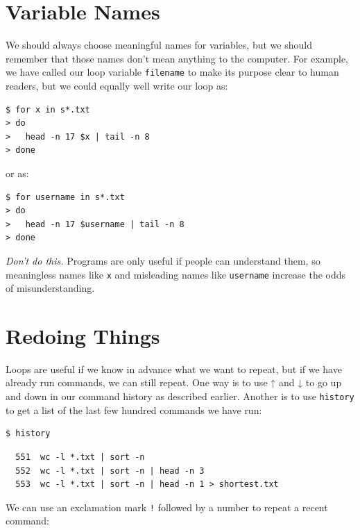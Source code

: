 \documentclass[
]{krantz}
\begin{document}
\hypertarget{bash-tools-meaningless}{%
\section{Variable Names}\label{bash-tools-meaningless}}

We should always choose meaningful names for variables,
but we should remember that those names don't mean anything to the computer.
For example,
we have called our loop variable \texttt{filename}
to make its purpose clear to human readers,
but we could equally well write our loop as:

\begin{verbatim}
$ for x in s*.txt
> do
>   head -n 17 $x | tail -n 8
> done
\end{verbatim}

or as:

\begin{verbatim}
$ for username in s*.txt
> do
>   head -n 17 $username | tail -n 8
> done
\end{verbatim}

\emph{Don't do this.}
Programs are only useful if people can understand them,
so meaningless names like \texttt{x} and misleading names like \texttt{username}
increase the odds of misunderstanding.

\hypertarget{bash-tools-history}{%
\section{Redoing Things}\label{bash-tools-history}}

Loops are useful if we know in advance what we want to repeat,
but if we have already run commands,
we can still repeat.
One way is to use ↑ and ↓
to go up and down in our command history as described earlier.
Another is to use \texttt{history}
to get a list of the last few hundred commands we have run:

\begin{verbatim}
$ history
\end{verbatim}

\begin{verbatim}
  551  wc -l *.txt | sort -n
  552  wc -l *.txt | sort -n | head -n 3
  553  wc -l *.txt | sort -n | head -n 1 > shortest.txt
\end{verbatim}

We can use an exclamation mark \texttt{!} followed by a number
to repeat a recent command:
\end{document}
